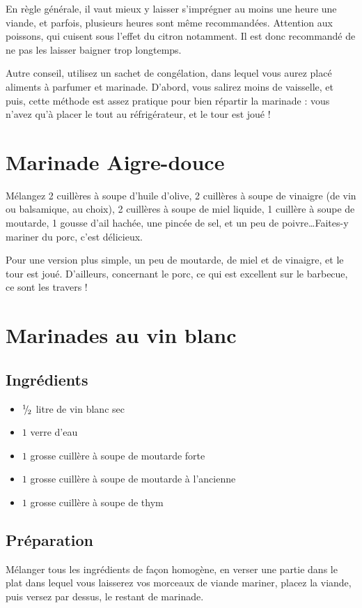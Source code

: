 \newpage
En règle générale, il vaut mieux y laisser s'imprégner au moins une heure une viande, et parfois, plusieurs heures sont même recommandées. Attention aux poissons, qui \og cuisent \fg sous l'effet du citron notamment. Il est donc recommandé de ne pas les laisser baigner trop longtemps.

Autre conseil, utilisez un sachet de congélation, dans lequel vous aurez placé aliments à parfumer et marinade. D'abord, vous salirez moins de vaisselle, et puis, cette méthode est assez pratique pour bien répartir la marinade : vous n'avez qu'à placer le tout au réfrigérateur, et le tour est joué !

\section{Marinade Aigre-douce}
Mélangez 2 cuillères à soupe d'huile d'olive, 2 cuillères à soupe de vinaigre (de vin ou balsamique, au choix), 2 cuillères à soupe de miel liquide, 1 cuillère à soupe de moutarde, 1 gousse d'ail hachée, une pincée de sel, et un peu de poivre\dots  Faites-y mariner du porc, c'est délicieux.

Pour une version plus simple, un peu de moutarde, de miel et de vinaigre, et le tour est joué. D'ailleurs, concernant le porc, ce qui est excellent sur le barbecue, ce sont les travers !

\section{Marinades au vin blanc}
\subsection*{Ingrédients}

\begin{itemize}
\item ${{}^{1\!\!}/ _{\!2}}$ litre de vin blanc sec
\item $1$ verre d'eau
\item $1$ grosse cuillère à soupe de moutarde forte
\item $1$ grosse cuillère à soupe de moutarde à l'ancienne
\item $1$ grosse cuillère à soupe de thym
\end{itemize}

\subsection*{Préparation}
Mélanger tous les ingrédients de façon homogène, en verser une partie dans le plat dans lequel vous laisserez vos morceaux de viande mariner, placez la viande, puis versez par dessus, le restant de marinade.

